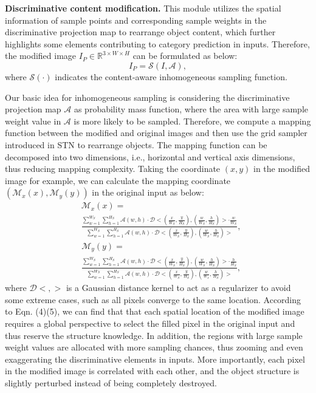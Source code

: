 \documentclass[letterpaper]{article} %
\begin{document}
\textbf{Discriminative content modification.}
This module utilizes the spatial information of sample points and corresponding sample weights in the discriminative projection map to rearrange object content, which further highlights some elements contributing to category prediction in inputs. Therefore, the modified image $ I_P \in\mathbb{R}^{3\times W \times H} $ can be formulated as below:
\begin{equation}
I_P = \mathcal{S}(I, \mathcal{A}),
\end{equation}
where $ \mathcal{S}(\cdot) $ indicates the content-aware inhomogeneous sampling function.

Our basic idea for inhomogeneous sampling is considering the discriminative projection map $ \mathcal{A} $ as probability mass function, where the area with large sample weight value in $ \mathcal{A} $ is more likely to be sampled. Therefore, we compute a mapping function between the modified and original images and then use the grid sampler introduced in STN \cite{DBLP:conf/nips/JaderbergSZK15} to rearrange objects. The mapping function can be decomposed into two dimensions, i.e., horizontal and vertical axis dimensions, thus reducing mapping complexity. Taking the coordinate $ (x, y) $ in the modified image for example, we can calculate the mapping coordinate $(\mathcal{M}_x(x), \mathcal{M}_y(y))$ in the original input as below:
\begin{equation}
\begin{aligned}
&\mathcal{M}_x(x) =  \\
& \frac{\sum_{w = 1 }^{W_S}\sum_{h = 1 }^{H_S}\mathcal{A}(w, h)\cdot \mathcal{D}<(\frac{x}{W_S},\frac{y}{H_S}),(\frac{w}{W_S},\frac{h}{H_S})> \cdot \frac{w}{W_S}}{\sum_{w = 1 }^{W_S}\sum_{h = 1 }^{H_S}\mathcal{A}(w, h)\cdot \mathcal{D}<(\frac{x}{W_S},\frac{y}{H_S}),(\frac{w}{W_S},\frac{h}{H_S})>},
\end{aligned}
\end{equation}
\begin{equation}
\begin{aligned}
&\mathcal{M}_y(y) = \\ &\frac{\sum_{w = 1 }^{W_S}\sum_{h = 1 }^{H_S}\mathcal{A}(w, h)\cdot \mathcal{D}<(\frac{x}{W_S},\frac{y}{H_S}),(\frac{w}{W_S},\frac{h}{H_S})> \cdot \frac{h}{H_S}}{\sum_{w = 1 }^{W_S}\sum_{h = 1 }^{H_S}\mathcal{A}(w, h)\cdot \mathcal{D}<(\frac{x}{W_S},\frac{y}{H_S}),(\frac{w}{W_s},\frac{h}{H_S})>},
\end{aligned}
\end{equation}
where $ \mathcal{D}<,> $ is a Gaussian distance kernel to act as a regularizer to avoid some extreme cases, such as all pixels converge to the same location. According to Eqn. (4)(5), we can find that that each spatial location of the modified image requires a global perspective to select the filled pixel in the original input and thus reserve the structure knowledge. In addition, the regions with large sample weight values are allocated with more sampling chances, thus zooming and even exaggerating the discriminative elements in inputs. More importantly, each pixel in the modified image is correlated with each other, and the object structure is slightly perturbed instead of being completely destroyed.
\end{document}

